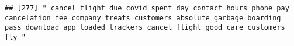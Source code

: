\documentclass[
]{article}
\begin{document}
\begin{verbatim}
## [277] " cancel flight due covid spent day contact hours phone pay cancelation fee company treats customers absolute garbage boarding pass download app loaded trackers cancel flight good care customers fly "                                                                                                                                                                                                                                                                                                                                                                                                                                                                                                                                                                                                                                                                                                                                                                                                                                                                                                                                                                                                                                                                                                                                                                                                                                                                                                                                                                                                                                                                                                                                                                                        

\end{verbatim}
\end{document}

